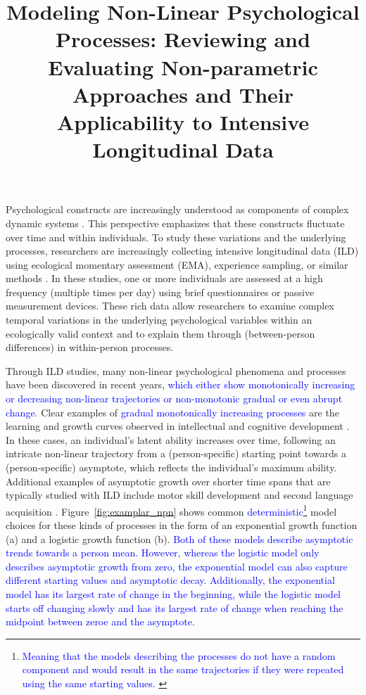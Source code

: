 \documentclass[man, floatsintext]{apa7}
\title{Modeling Non-Linear Psychological Processes: Reviewing and Evaluating
  Non-parametric Approaches and Their Applicability to Intensive
  Longitudinal Data}
\begin{document}
\maketitle

Psychological constructs are increasingly understood as components of complex
dynamic systems \parencite{nesselroade_studying_2004, wang_investigating_2012}.
This perspective emphasizes that these constructs fluctuate over time and
within individuals. To study these variations and the underlying processes,
researchers are increasingly collecting intensive longitudinal data (ILD) using
ecological momentary assessment (EMA), experience sampling, or similar methods
\parencite{fritz_so_2023}. In these studies, one or more individuals are
assessed at a high frequency (multiple times per day) using brief
questionnaires or passive measurement devices. These rich data allow
researchers to examine complex temporal variations in the underlying
psychological variables within an ecologically valid context and to explain
them through (between-person differences) in within-person processes.

Through ILD studies, many non-linear psychological phenomena and processes have
been discovered in recent years, \textcolor{blue}{which either show
  monotonically increasing or decreasing non-linear trajectories or
  non-monotonic
  gradual or even abrupt change}. Clear examples of \textcolor{blue}{ gradual
  monotonically increasing processes} are the learning and growth curves
observed
in intellectual and cognitive development \parencite{kunnen_dynamic_2012,
  mcardle_comparative_2002}. In these cases, an individual's latent ability
increases over time, following an intricate non-linear trajectory from a
(person-specific) starting point towards a (person-specific) asymptote, which
reflects the individual's maximum ability. Additional examples of asymptotic
growth over shorter time spans that are typically studied with ILD include
motor skill development \parencite{newell_time_2001} and second language
acquisition \parencite{de_bot_dynamic_2007}. Figure~\ref{fig:examplar_npn}
shows common \textcolor{blue}{deterministic}\footnote{\textcolor{blue}{
    Meaning that the models describing the processes do not have a random
    component and would result in the same trajectories if they were repeated
    using the same starting values.
  }} model choices for these kinds of
processes in the form of an exponential growth function (a) and a logistic
growth function (b). \textcolor{blue}{Both of these models describe asymptotic
  trends towards a person mean. However, whereas the logistic model only
  describes asymptotic growth from zero, the exponential model can also capture
  different starting values and asymptotic decay. Additionally, the exponential
  model has its largest rate of change in the beginning, while the logistic
  model
  starts off changing slowly and has its largest rate of change when reaching
  the
  midpoint between zeroe and the asymptote.}
\end{document}
